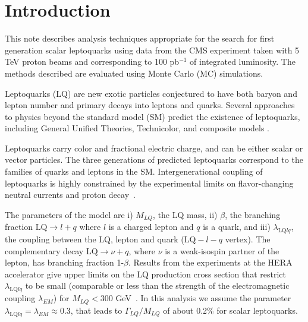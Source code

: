 \setcounter{page}{2}%

\section{Introduction}
This note describes analysis techniques 
appropriate for the
search for first generation scalar leptoquarks 
using data from the CMS experiment taken with 5 TeV proton beams and 
corresponding to 100 pb$^{-1}$ of integrated luminosity.
The methods described are evaluated using 
Monte Carlo (MC) simulations.

%
Leptoquarks (LQ) are new exotic particles conjectured to have both baryon and lepton number 
and primary decays into leptons and quarks. 
Several approaches to physics beyond the standard model (SM) predict the existence of leptoquarks,
including General Unified Theories, Technicolor, and composite models \cite{Acosta:1999ws}.  

Leptoquarks carry color and fractional electric charge, 
and can be either scalar or vector particles. The three generations of predicted leptoquarks 
correspond to the families of quarks and leptons in the SM.  Intergenerational coupling of 
leptoquarks is highly constrained by the experimental limits on flavor-changing neutral currents
and proton decay~\cite{Acosta:1999ws,Davidson:1993qk}. 


The parameters of the model are i) $M_{LQ}$, the LQ mass, ii) $\beta$, 
the branching fraction 
$\mbox{LQ} \rightarrow l + q$
where $l$ is a charged lepton and $q$ is a quark, and
iii) $\lambda_{\mbox{LQ}lq}$, the coupling between the LQ, lepton and 
quark ($\mbox{LQ}-l-q$ vertex). 
The complementary decay $\mbox{LQ} \rightarrow \nu + q$, 
where $\nu$ is a weak-isospin partner of the lepton,
has branching fraction 1-$\beta$.
Results from the experiments at the HERA accelerator
give upper limits on the LQ production cross section that restrict  
$\lambda_{\mbox{LQ}lq}$ to be small (comparable or less than the strength of 
the electromagnetic coupling $\lambda_{EM}$) for $M_{LQ}<300$ GeV~\cite{Aktas:2005pr}. 
In this analysis we assume the parameter 
$\lambda_{\mbox{LQ}lq} = \lambda_{EM} \approx 0.3$, 
that leads to $\Gamma_{LQ}/M_{LQ}$ of about 0.2\% for scalar leptoquarks. 



